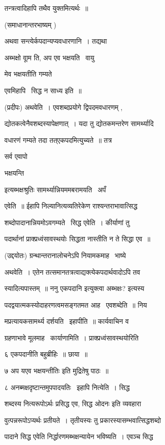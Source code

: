 \documentclass[11pt, openany]{book}
\begin{document}
तन्त्रत्वादिहापि तथैव युक्तमित्यर्थः~॥ 

(समाधानान्तरभाष्यम् ) 

अथवा सन्त्येर्कपदान्यप्यवधारणानि~। तद्यथा \textendash\ 

अब्भक्षो वाूम ति, अप एव भक्षयति \textendash\ वायु \textendash\ 

मेव भक्षयतीति गम्यते 

एवमिहापि \textendash\ सिद्ध न साध्य इति~॥ 

(प्रदीपः) अथवेति~। एवशब्दप्रयोगे द्विपदमवधारणम् , 

द्योतकत्वेनैवशब्दस्यापेक्षणात्~। यदा तु द्योतकमन्तरेण सामर्थ्यादि \textendash\ 

वधारणं गम्यते तदा तत्एकपदमित्युच्यते~॥ तत्र {\qt सर्व एवापो 

भक्षयन्ति} इत्यब्भक्षश्रुतिः सामर्थ्यान्नियममबरामयति \textendash\ अपँ 

एवेति~॥ ईहापि निल्यानित्यव्यतिरेकेण राश्यन्तराभावात्सिद्ध \textendash\ 

शब्दोपादानान्नियमोऽवगम्यते \textendash\ सिद्ध एवेति~। कीर्याणां तु 

पदार्थानां प्राक्प्रध्वंसावस्थयोः सिद्धता नास्तीति न ते सिद्धा एव~॥ 

(उद्दयोतः) ग्रन्थान्तरानालोचनेऽपि नियामकमाह \textendash\ भाष्ये \textendash\ 

अथवेति~। एतेन तत्समानतत्रत्वाद्यक्त्येकपदार्थवादोऽपि तव 

स्यादित्यपास्तम्~॥ ननु {\qt एकपदानि} इत्युक्त्वा {\qt अब्भक्षः?} इत्यस्य 

पदद्वयात्मकस्योदाहरणत्वमसङ्गतमत आह \textendash\ एवशब्देति~॥ निय \textendash\ 

मप्रत्यायकसामर्थ्य दर्शयति \textendash\ इहापीति~॥ कार्यवाचिन व 

ग्रहणाभावे मूलमाह \textendash\ कार्याणामिति~। प्राक्प्रध्वंसावस्थयोरिति 



 

६ एकपदानीति बहुब्रीहिः~॥ छाया~॥ 

७ {\qt अप यएव भक्षयन्तीतिः} इति मुद्रितेषु पाठः~॥ 

८ अनब्मक्षदृष्टान्तमुपपादयतिः \textendash\ इहापि नित्येति~। सिद्ध \textendash\ 

शब्दस्य नित्यरूपोऽर्थः प्रसिद्ध एव, {\qt सिद्ध ओदनः} इति व्यवहारा \textendash\ 

वुत्पन्नरूपोऽप्यर्थः प्रतीयते~। तृतीयस्यः तु
प्रकारस्यासम्भवात्सिद्धशब्दो \textendash\ 

पादाने सिद्ध एवेति निर्द्धारणमब्भक्षन्यायेन भविष्यति~। एवञ्च सिद्ध 
\end{document}
